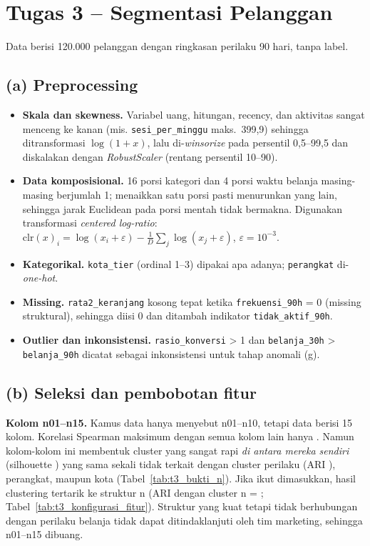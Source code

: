 \section{Tugas 3 -- Segmentasi Pelanggan}
Data berisi 120.000 pelanggan dengan ringkasan perilaku 90 hari, tanpa label.

\subsection*{(a) Preprocessing}
\begin{itemize}
  \item \textbf{Skala dan skewness.} Variabel uang, hitungan, recency, dan aktivitas sangat menceng ke kanan (mis. \texttt{sesi\_per\_minggu} maks.\ 399,9)
        sehingga ditransformasi $\log(1+x)$, lalu di-\textit{winsorize} pada persentil 0,5--99,5 dan diskalakan dengan \textit{RobustScaler} (rentang persentil 10--90).
  \item \textbf{Data komposisional.} 16 porsi kategori dan 4 porsi waktu belanja masing-masing berjumlah 1; menaikkan satu porsi pasti menurunkan yang lain,
        sehingga jarak Euclidean pada porsi mentah tidak bermakna. Digunakan transformasi \textit{centered log-ratio}:
        $\mathrm{clr}(x)_i = \log(x_i+\varepsilon) - \frac{1}{D}\sum_j \log(x_j+\varepsilon)$, $\varepsilon = 10^{-3}$.
  \item \textbf{Kategorikal.} \texttt{kota\_tier} (ordinal 1--3) dipakai apa adanya; \texttt{perangkat} di-\textit{one-hot}.
  \item \textbf{Missing.} \texttt{rata2\_keranjang} kosong tepat ketika \texttt{frekuensi\_90h} = 0 (missing struktural), sehingga diisi 0 dan ditambah indikator \texttt{tidak\_aktif\_90h}.
  \item \textbf{Outlier dan inkonsistensi.} \texttt{rasio\_konversi} > 1 dan \texttt{belanja\_30h} > \texttt{belanja\_90h} dicatat sebagai inkonsistensi untuk tahap anomali (g).
\end{itemize}

\subsection*{(b) Seleksi dan pembobotan fitur}
\textbf{Kolom n01--n15.} Kamus data hanya menyebut n01--n10, tetapi data berisi 15 kolom. Korelasi Spearman maksimum dengan semua kolom lain hanya \TtigaNMaxKorelasi.
Namun kolom-kolom ini membentuk cluster yang sangat rapi \emph{di antara mereka sendiri} (silhouette \TtigaNSil) yang sama sekali tidak terkait
dengan cluster perilaku (ARI \TtigaNARIPerilaku), perangkat, maupun kota (Tabel~\ref{tab:t3_bukti_n}). Jika ikut dimasukkan, hasil clustering tertarik
ke struktur n (ARI dengan cluster n = \TtigaSemuaVsN; Tabel~\ref{tab:t3_konfigurasi_fitur}). Struktur yang kuat tetapi tidak berhubungan dengan perilaku
belanja tidak dapat ditindaklanjuti oleh tim marketing, sehingga n01--n15 dibuang.

